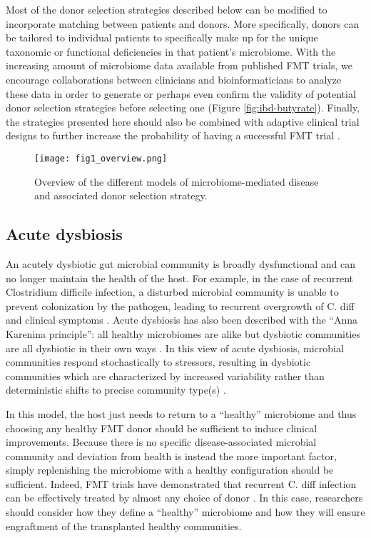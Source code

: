 Most of the donor selection strategies described below can be modified to incorporate matching between patients and donors.
More specifically, donors can be tailored to individual patients to specifically make up for the unique taxonomic or functional deficiencies in that patient's microbiome.
With the increasing amount of microbiome data available from published FMT trials, we encourage collaborations between clinicians and bioinformaticians to analyze these data in order to generate or perhaps even confirm the validity of potential donor selection strategies before selecting one (Figure \ref{fig:ibd-butyrate}).
Finally, the strategies presented here should also be combined with adaptive clinical trial designs to further increase the probability of having a successful FMT trial \cite{Olesen2017}.

\begin{figure}
    \begin{center}
    \texttt{[image: fig1\_overview.png]}
    \caption{Overview of the different models of microbiome-mediated disease and associated donor selection strategy.}\label{fig:disease-models}
    \end{center}
\end{figure}

\subsection{Acute dysbiosis}

An acutely dysbiotic gut microbial community is broadly dysfunctional and can no longer maintain the health of the host.
For example, in the case of recurrent Clostridium difficile infection, a disturbed microbial community is unable to prevent colonization by the pathogen, leading to recurrent overgrowth of C. diff and clinical symptoms \cite{Britton2014}.
Acute dysbiosis has also been described with the ``Anna Karenina principle'': all healthy microbiomes are alike but dysbiotic communities are all dysbiotic in their own ways \cite{Zaneveld2017}.
In this view of acute dysbiosis, microbial communities respond stochastically to stressors, resulting in dysbiotic communities which are characterized by increased variability rather than deterministic shifts to precise community type(s) \cite{Zaneveld2017}.

In this model, the host just needs to return to a ``healthy'' microbiome and thus choosing any healthy FMT donor should be sufficient to induce clinical improvements.
Because there is no specific disease-associated microbial community and deviation from health is instead the more important factor, simply replenishing the microbiome with a healthy configuration should be sufficient.
Indeed, FMT trials have demonstrated that recurrent C. diff infection can be effectively treated by almost any choice of donor \cite{Osman2016}.
In this case, researchers should consider how they define a ``healthy'' microbiome and how they will ensure engraftment of the transplanted healthy communities.

